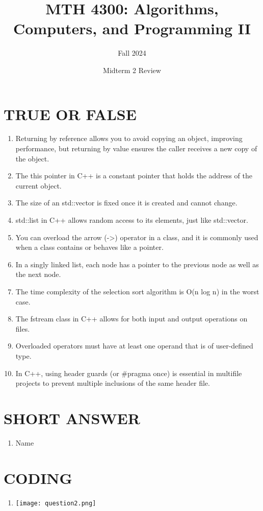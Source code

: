 \documentclass[a4paper]{article}
\title{MTH 4300: Algorithms, Computers, and Programming II}
\author{Fall 2024}
\date{Midterm 2 Review}
\begin{document}
\maketitle


\section{TRUE OR FALSE}
\begin{enumerate}
    \item  Returning by reference allows you to avoid copying an object, 
           improving performance, but returning by value ensures the caller
           receives a new copy of the object.
    \item The this pointer in C++ is a constant pointer that holds the address
          of the current object.
    \item The size of an std::vector is fixed once it is created and cannot change.
    \item std::list in C++ allows random access to its elements, just like std::vector.
    \item You can overload the arrow (->) operator in a class, and it is commonly
          used when a class contains or behaves like a pointer.
    \item In a singly linked list, each node has a pointer to the previous node as well as the next node.
    \item The time complexity of the selection sort algorithm is O(n log n) in the worst case.
    \item The fstream class in C++ allows for both input and output operations on files.
    \item Overloaded operators must have at least one operand that is of user-defined type.
    \item In C++, using header guards (or #pragma once) is essential in 
          multifile projects to prevent multiple inclusions of the same header file.
\end{enumerate}
\newpage


\section{SHORT ANSWER}
\begin{enumerate}
    \item Name 
\end{enumerate}
\newpage 


\section{CODING}
\begin{enumerate}
    \item \texttt{[image: question2.png]}
    
\end{enumerate} 
\newpage
\end{document}

